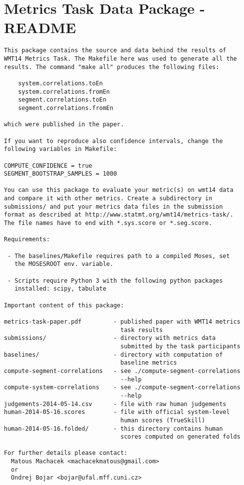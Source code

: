 \appendix
\chapter{Metrics Task Data Package - README}

\begin{verbatim}
This package contains the source and data behind the results of
WMT14 Metrics Task. The Makefile here was used to generate all the
results. The command "make all" produces the following files: 

    system.correlations.toEn
    system.correlations.fromEn
    segment.correlations.toEn
    segment.correlations.fromEn

which were published in the paper.

If you want to reproduce also confidence intervals, change the
following variables in Makefile:

COMPUTE_CONFIDENCE = true
SEGMENT_BOOTSTRAP_SAMPLES = 1000

You can use this package to evaluate your metric(s) on wmt14 data
and compare it with other metrics. Create a subdirectory in
submissions/ and put your metrics data files in the submission
format as described at http://www.statmt.org/wmt14/metrics-task/.
The file names have to end with *.sys.score or *.seg.score.

Requirements:
 
 - The baselines/Makefile requires path to a compiled Moses, set
   the MOSESROOT env. variable.

 - Scripts require Python 3 with the following python packages
   installed: scipy, tabulate

Important content of this package:

metrics-task-paper.pdf         - published paper with WMT14 metrics
                                 task results
submissions/                   - directory with metrics data
                                 submitted by the task participants
baselines/                     - directory with computation of
                                 baseline metrics
compute-segment-correlations   - see ./compute-segment-correlations
                                 --help
compute-system-correlations    - see ./compute-segment-correlations
                                 --help
judgements-2014-05-14.csv      - file with raw human judgements
human-2014-05-16.scores        - file with official system-level
                                 human scores (TrueSkill)
human-2014-05-16.folded/       - this directory contains human
                                 scores computed on generated folds

For further details please contact:
  Matous Machacek <machacekmatous@gmail.com>
  or
  Ondrej Bojar <bojar@ufal.mff.cuni.cz>
\end{verbatim}
